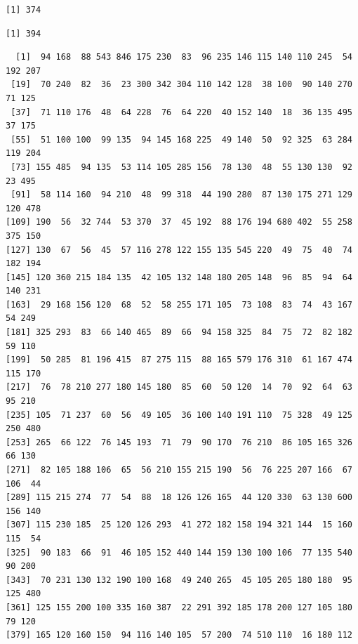 \documentclass[
  letterpaper,
  DIV=11,
  numbers=noendperiod]{scrreprt}
\newenvironment{Shaded}{\begin{snugshade}}{\end{snugshade}}
\newcommand{\CommentTok}[1]{\textcolor[rgb]{0.37,0.37,0.37}{#1}}
\newcommand{\FunctionTok}[1]{\textcolor[rgb]{0.28,0.35,0.67}{#1}}
\newcommand{\NormalTok}[1]{\textcolor[rgb]{0.00,0.23,0.31}{#1}}
\newcommand{\SpecialCharTok}[1]{\textcolor[rgb]{0.37,0.37,0.37}{#1}}
\begin{document}
\begin{verbatim}
[1] 374
\end{verbatim}

\begin{Shaded}
\end{Shaded}

\begin{verbatim}
[1] 394
\end{verbatim}

\begin{Shaded}
\end{Shaded}

\begin{verbatim}
  [1]  94 168  88 543 846 175 230  83  96 235 146 115 140 110 245  54 192 207
 [19]  70 240  82  36  23 300 342 304 110 142 128  38 100  90 140 270  71 125
 [37]  71 110 176  48  64 228  76  64 220  40 152 140  18  36 135 495  37 175
 [55]  51 100 100  99 135  94 145 168 225  49 140  50  92 325  63 284 119 204
 [73] 155 485  94 135  53 114 105 285 156  78 130  48  55 130 130  92  23 495
 [91]  58 114 160  94 210  48  99 318  44 190 280  87 130 175 271 129 120 478
[109] 190  56  32 744  53 370  37  45 192  88 176 194 680 402  55 258 375 150
[127] 130  67  56  45  57 116 278 122 155 135 545 220  49  75  40  74 182 194
[145] 120 360 215 184 135  42 105 132 148 180 205 148  96  85  94  64 140 231
[163]  29 168 156 120  68  52  58 255 171 105  73 108  83  74  43 167  54 249
[181] 325 293  83  66 140 465  89  66  94 158 325  84  75  72  82 182  59 110
[199]  50 285  81 196 415  87 275 115  88 165 579 176 310  61 167 474 115 170
[217]  76  78 210 277 180 145 180  85  60  50 120  14  70  92  64  63  95 210
[235] 105  71 237  60  56  49 105  36 100 140 191 110  75 328  49 125 250 480
[253] 265  66 122  76 145 193  71  79  90 170  76 210  86 105 165 326  66 130
[271]  82 105 188 106  65  56 210 155 215 190  56  76 225 207 166  67 106  44
[289] 115 215 274  77  54  88  18 126 126 165  44 120 330  63 130 600 156 140
[307] 115 230 185  25 120 126 293  41 272 182 158 194 321 144  15 160 115  54
[325]  90 183  66  91  46 105 152 440 144 159 130 100 106  77 135 540  90 200
[343]  70 231 130 132 190 100 168  49 240 265  45 105 205 180 180  95 125 480
[361] 125 155 200 100 335 160 387  22 291 392 185 178 200 127 105 180  79 120
[379] 165 120 160 150  94 116 140 105  57 200  74 510 110  16 180 112
\end{verbatim}
\end{document}

